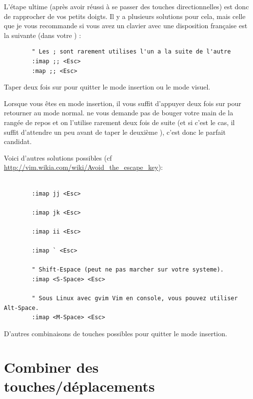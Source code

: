 L'étape ultime (après avoir réussi à se passer des touches directionnelles) est donc de rapprocher \ttesc de vos petits doigts. Il y a plusieurs solutions pour cela, mais celle que je vous recommande si vous avez un clavier avec une disposition française est la suivante (dans votre \vimrc) :

\begin{listing}[H]

    \begin{verbatim}
        " Les ; sont rarement utilises l'un a la suite de l'autre
        :imap ;; <Esc>
        :map ;; <Esc>
    \end{verbatim}
    \caption{Taper deux fois sur \hlred{;} pour quitter le mode insertion ou le mode visuel.}
    \label{code:avoid-esc}
\end{listing}

Lorsque vous êtes en mode insertion, il vous suffit d'appuyer deux fois sur \ttsemicolon pour retourner au mode normal. \ttsemicolon ne vous demande pas de bouger votre main de la rangée de repos et on l'utilise rarement deux fois de suite (et si c'est le cas, il suffit d'attendre un peu avant de taper le deuxième \tsemicolon), c'est donc le parfait candidat.

Voici d'autres solutions possibles (cf \url{http://vim.wikia.com/wiki/Avoid_the_escape_key}):

\begin{listing}[H]
    \begin{verbatim}

        :imap jj <Esc>

        :imap jk <Esc>

        :imap ii <Esc>

        :imap ` <Esc>

        " Shift-Espace (peut ne pas marcher sur votre systeme).
        :imap <S-Space> <Esc>

        " Sous Linux avec gvim Vim en console, vous pouvez utiliser Alt-Space.
        :imap <M-Space> <Esc>
    \end{verbatim}
    \caption{D'autres combinaisons de touches possibles pour quitter le mode insertion.}
    \label{code:avoid-esc-alt}
\end{listing}

\section{Combiner des touches/déplacements}
\label{sec:combine-move}

